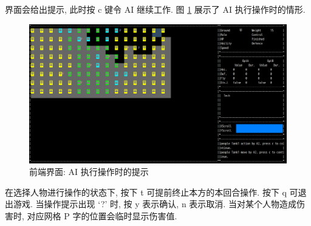 \documentclass[UTF8, zihao=-4]{ctexart} %
\begin{document}
界面会给出提示, 此时按 c 键令 AI 继续工作. 图 \ref{fui_5} 展示了 AI 执行操作时的情形.
\begin{figure}
      \centering
      \includegraphics[width=\textwidth]{ui_ai.png}
      \caption{\label{fui_5}前端界面: AI 执行操作时的提示}
\end{figure}
在选择人物进行操作的状态下, 按下 t 可提前终止本方的本回合操作. 按下 q 可退出游戏.
当操作提示出现 `?' 时, 按 y 表示确认, n 表示取消. 当对某个人物造成伤害时, 对应网格 P 字的位置会临时显示伤害值.
\end{document}
